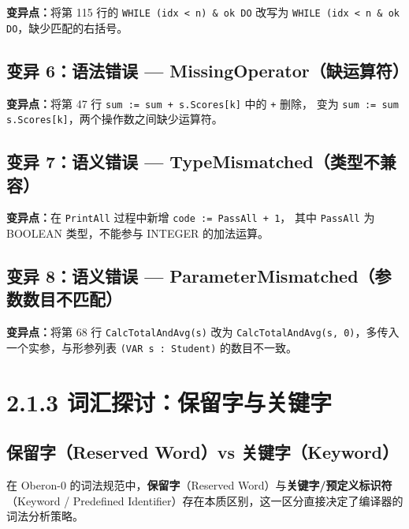 \documentclass[a4paper]{article}
\begin{document}


\textbf{变异点：}将第 115 行的 \texttt{WHILE (idx < n) \& ok DO} 改写为
\texttt{WHILE (idx < n \& ok DO}，缺少匹配的右括号。

\subsection{变异 6：语法错误 — MissingOperator（缺运算符）}



\textbf{变异点：}将第 47 行 \texttt{sum := sum + s.Scores[k]} 中的 \texttt{+} 删除，
变为 \texttt{sum := sum s.Scores[k]}，两个操作数之间缺少运算符。

\subsection{变异 7：语义错误 — TypeMismatched（类型不兼容）}



\textbf{变异点：}在 \texttt{PrintAll} 过程中新增 \texttt{code := PassAll + 1}，
其中 \texttt{PassAll} 为 BOOLEAN 类型，不能参与 INTEGER 的加法运算。

\subsection{变异 8：语义错误 — ParameterMismatched（参数数目不匹配）}



\textbf{变异点：}将第 68 行 \texttt{CalcTotalAndAvg(s)} 改为
\texttt{CalcTotalAndAvg(s, 0)}，多传入一个实参，与形参列表
\texttt{(VAR s : Student)} 的数目不一致。

\section{2.1.3 词汇探讨：保留字与关键字}

\subsection{保留字（Reserved Word）vs 关键字（Keyword）}

在 Oberon-0 的词法规范中，\textbf{保留字}（Reserved Word）与\textbf{关键字/预定义标识符}
（Keyword / Predefined Identifier）存在本质区别，这一区分直接决定了编译器的词法分析策略。
\end{document}
